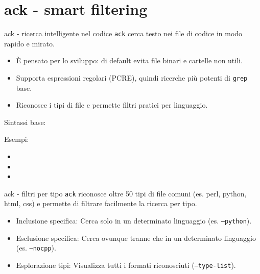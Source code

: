 \section{ack - smart filtering}
\begin{frame}[fragile]{ack - ricerca intelligente nel codice}
  \texttt{ack} cerca testo nei file di codice in modo rapido e mirato.

  \begin{itemize}
    \item È pensato per lo sviluppo: di default evita file binari e cartelle non utili.
    \item Supporta espressioni regolari (PCRE), quindi ricerche più potenti di \texttt{grep} base.
    \item Riconosce i tipi di file e permette filtri pratici per linguaggio.
  \end{itemize}

  \medskip
  Sintassi base: 

  \medskip
  Esempi:
  \begin{itemize}
    \item {}
    \item {}
    \item {}
  \end{itemize}
\end{frame}

\begin{frame}[fragile]{ack - filtri per tipo}
  \texttt{ack} riconosce oltre 50 tipi di file comuni (es. perl, python, html, css) e permette di filtrare facilmente la ricerca per tipo.

  \begin{itemize}
	\item Inclusione specifica: Cerca solo in un determinato linguaggio (es. \texttt{--python}).
	\item Esclusione specifica: Cerca ovunque tranne che in un determinato linguaggio (es. \texttt{--nocpp}).
	\item Esplorazione tipi: Visualizza tutti i formati riconosciuti (\texttt{--type-list}).
  \end{itemize}

\end{frame}

